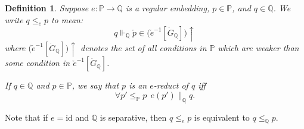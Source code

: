 \documentclass{amsart}
\newtheorem{definition}[theorem]{Definition}
\begin{document}
\begin{definition}\label{def_GeneralizedOrder}
Suppose $e: \mathbb{P} \to \mathbb{Q}$ is a regular embedding, $p \in \mathbb{P}$, and $q \in \mathbb{Q}$.  We write $q \le_e p$ to mean:
\begin{equation*}
q \Vdash_{\mathbb{Q}} \check{p} \in \Big(\check{e}^{-1}[\dot{G}_{\mathbb{Q}}]\Big) \uparrow
\end{equation*}
where $\Big( \check{e}^{-1}[\dot{G}_{\mathbb{Q}}]\Big) \uparrow$ denotes the set of all conditions in $\mathbb{P}$ which are weaker than some condition in $\check{e}^{-1}[\dot{G}_{\mathbb{Q}}]$.

If $q \in \mathbb{Q}$ and $p \in \mathbb{P}$, we say that $p$ is an \emph{$e$-reduct of $q$} iff
\[
\forall p' \le_{\mathbb{P}} p \ \ e(p') \parallel_{\mathbb{Q}} q  .
\]
\end{definition}
Note that if $e = \text{id}$ and $\mathbb{Q}$ is separative, then $q \le_e p$ is equivalent to $q \le_{\mathbb{Q}} p$.
\end{document}

